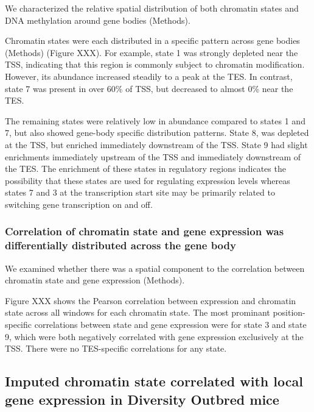 \documentclass[10pt,letterpaper]{article}
\begin{document}
We characterized the relative spatial distribution of both chromatin
states and DNA methylation around gene bodies (Methods).

Chromatin states were each distributed in a specific pattern across gene
bodies (Methods) (Figure XXX). For example, state 1 was strongly
depleted near the TSS, indicating that this region is commonly subject
to chromatin modification. However, its abundance increased steadily to
a peak at the TES. In contrast, state 7 was present in over 60\% of TSS,
but decreased to almost 0\% near the TES.

The remaining states were relatively low in abundance compared to states
1 and 7, but also showed gene-body specific distribution patterns. State
8, was depleted at the TSS, but enriched immediately downstream of the
TSS. State 9 had slight enrichments immediately upstream of the TSS and
immediately downstream of the TES. The enrichment of these states in
regulatory regions indicates the possibility that these states are used
for regulating expression levels whereas states 7 and 3 at the
transcription start site may be primarily related to switching gene
transcription on and off.

\hypertarget{correlation-of-chromatin-state-and-gene-expression-was-differentially-distributed-across-the-gene-body}{%
\subsubsection{Correlation of chromatin state and gene expression was
differentially distributed across the gene
body}\label{correlation-of-chromatin-state-and-gene-expression-was-differentially-distributed-across-the-gene-body}}

We examined whether there was a spatial component to the correlation
between chromatin state and gene expression (Methods).

Figure XXX shows the Pearson correlation between expression and
chromatin state across all windows for each chromatin state. The most
prominant position-specific correlations between state and gene
expression were for state 3 and state 9, which were both negatively
correlated with gene expression exclusively at the TSS. There were no
TES-specific correlations for any state.

\hypertarget{imputed-chromatin-state-correlated-with-local-gene-expression-in-diversity-outbred-mice}{%
\subsection{Imputed chromatin state correlated with local gene
expression in Diversity Outbred
mice}\label{imputed-chromatin-state-correlated-with-local-gene-expression-in-diversity-outbred-mice}}
\end{document}
